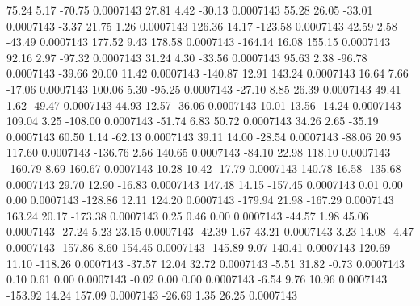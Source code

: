       75.24        5.17      -70.75     0.0007143
       27.81        4.42      -30.13     0.0007143
       55.28       26.05      -33.01     0.0007143
       -3.37       21.75        1.26     0.0007143
      126.36       14.17     -123.58     0.0007143
       42.59        2.58      -43.49     0.0007143
      177.52        9.43      178.58     0.0007143
     -164.14       16.08      155.15     0.0007143
       92.16        2.97      -97.32     0.0007143
       31.24        4.30      -33.56     0.0007143
       95.63        2.38      -96.78     0.0007143
      -39.66       20.00       11.42     0.0007143
     -140.87       12.91      143.24     0.0007143
       16.64        7.66      -17.06     0.0007143
      100.06        5.30      -95.25     0.0007143
      -27.10        8.85       26.39     0.0007143
       49.41        1.62      -49.47     0.0007143
       44.93       12.57      -36.06     0.0007143
       10.01       13.56      -14.24     0.0007143
      109.04        3.25     -108.00     0.0007143
      -51.74        6.83       50.72     0.0007143
       34.26        2.65      -35.19     0.0007143
       60.50        1.14      -62.13     0.0007143
       39.11       14.00      -28.54     0.0007143
      -88.06       20.95      117.60     0.0007143
     -136.76        2.56      140.65     0.0007143
      -84.10       22.98      118.10     0.0007143
     -160.79        8.69      160.67     0.0007143
       10.28       10.42      -17.79     0.0007143
      140.78       16.58     -135.68     0.0007143
       29.70       12.90      -16.83     0.0007143
      147.48       14.15     -157.45     0.0007143
        0.01        0.00        0.00     0.0007143
     -128.86       12.11      124.20     0.0007143
     -179.94       21.98     -167.29     0.0007143
      163.24       20.17     -173.38     0.0007143
        0.25        0.46        0.00     0.0007143
      -44.57        1.98       45.06     0.0007143
      -27.24        5.23       23.15     0.0007143
      -42.39        1.67       43.21     0.0007143
        3.23       14.08       -4.47     0.0007143
     -157.86        8.60      154.45     0.0007143
     -145.89        9.07      140.41     0.0007143
      120.69       11.10     -118.26     0.0007143
      -37.57       12.04       32.72     0.0007143
       -5.51       31.82       -0.73     0.0007143
        0.10        0.61        0.00     0.0007143
       -0.02        0.00        0.00     0.0007143
       -6.54        9.76       10.96     0.0007143
     -153.92       14.24      157.09     0.0007143
      -26.69        1.35       26.25     0.0007143

